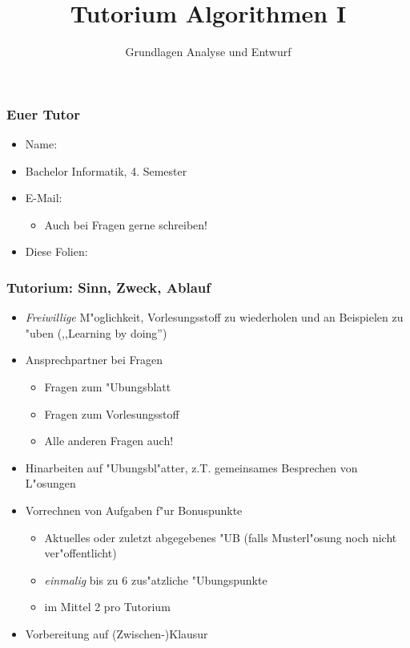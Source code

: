 \documentclass[t]{beamer}
\title[]{Tutorium Algorithmen I}
\subtitle{Grundlagen Analyse und Entwurf \\[0.3em]
          \footnotesize \authorName}
\author[]{\authorName}
\institute[]{INSTITUT FÜR THEORETISCHE INFORMATIK, PROF. SANDERS}
\begin{document}
\begin{frame}
  \maketitle
\end{frame}

\begin{frame}
  \frametitle{Euer Tutor}
  \begin{itemize}
    \item Name: \authorName
    \item Bachelor Informatik, 4. Semester
    \item E-Mail: \authorEmail
      \begin{itemize}
      \item Auch bei Fragen gerne schreiben!
      \end{itemize}
    \item Diese Folien: \authorHomepage
  \end{itemize}
\end{frame}

\begin{frame}
  \frametitle{Tutorium: Sinn, Zweck, Ablauf}
  \begin{itemize}
    \item \emph{Freiwillige} M"oglichkeit, Vorlesungsstoff zu wiederholen und
          an Beispielen zu "uben (,,Learning by doing'')
    \item Ansprechpartner bei Fragen
      \begin{itemize}
      \item Fragen zum "Ubungsblatt
      \item Fragen zum Vorlesungsstoff
      \item Alle anderen Fragen auch!
      \end{itemize}
    \item Hinarbeiten auf "Ubungsbl"atter, z.T. gemeinsames Besprechen von L"osungen
    \item Vorrechnen von Aufgaben f"ur Bonuspunkte
      \begin{itemize}
      \item Aktuelles oder zuletzt abgegebenes "UB (falls Musterl"osung noch
            nicht ver"offentlicht)
      \item \emph{einmalig} bis zu 6 zus"atzliche "Ubungspunkte
      \item im Mittel 2 pro Tutorium
      \end{itemize}
    \item Vorbereitung auf (Zwischen-)Klausur
  \end{itemize}
\end{frame}
\end{document}
